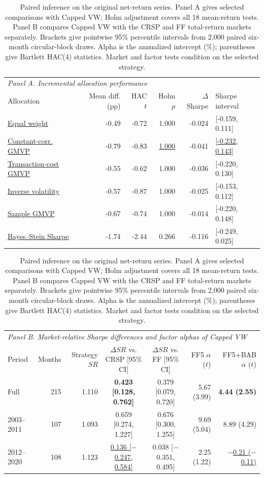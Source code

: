 \documentclass[letterpaper,journal]{IEEEtran}
\begin{document}
\begin{table}[!tp]\centering
\caption{Paired inference on the original net-return series. Panel A gives selected comparisons with Capped VW; Holm adjustment covers all 18 mean-return tests. Panel B compares Capped VW with the CRSP and FF total-return markets separately. Brackets give pointwise 95\% percentile intervals from 2,000 paired six-month circular-block draws. Alpha is the annualized intercept (\%); parentheses give Bartlett HAC(4) statistics. Market and factor tests condition on the selected strategy.}\label{tab:inference}
\small\begin{tabular}{lrrrrl}\toprule
\multicolumn{6}{l}{\textit{Panel A. Incremental allocation performance}}\\[2pt]
Allocation & Mean diff. (pp) & HAC $t$ & Holm $p$ & $\Delta$Sharpe & Sharpe interval\\\midrule
\hyperref[alloc:equal_weight]{Equal weight} & -0.49 & -0.72 & 1.000 & -0.024 & [-0.159, 0.111] \\
\hyperref[alloc:gmvp_constant_corr]{Constant-corr. GMVP} & -0.79 & -0.83 & \underline{1.000} & -0.041 & \underline{[-0.232, 0.143]} \\
\hyperref[alloc:tc_gmvp]{Transaction-cost GMVP} & -0.55 & -0.62 & 1.000 & -0.036 & [-0.220, 0.130] \\
\hyperref[alloc:inverse_vol]{Inverse volatility} & -0.57 & -0.87 & 1.000 & -0.025 & [-0.153, 0.112] \\
\hyperref[alloc:gmvp_sample]{Sample GMVP} & -0.67 & -0.74 & 1.000 & -0.014 & [-0.220, 0.148] \\
\hyperref[alloc:max_sharpe_bs]{Bayes--Stein Sharpe} & -1.74 & -2.44 & 0.266 & -0.116 & [-0.249, 0.025] \\
\bottomrule\end{tabular}
\par\medskip\begingroup\small\setlength{\tabcolsep}{3.5pt}
\begin{tabular}{lrrccrr}\toprule
\multicolumn{7}{l}{\textit{Panel B. Market-relative Sharpe differences and factor alphas of Capped VW}}\\[2pt]
Period & Months & Strategy $SR$ & $\Delta SR$ vs. CRSP [95\% CI] & $\Delta SR$ vs. FF [95\% CI] & FF5 $\alpha$ ($t$) & FF5+BAB $\alpha$ ($t$)\\\midrule
Full & 215 & 1.110 & \textbf{0.423 [0.128, 0.762]} & 0.379 [0.079, 0.720] & 5.67 (3.99) & \textbf{4.44 (2.55)}\\
2003--2011 & 107 & 1.093 & 0.659 [0.274, 1.227] & 0.676 [0.300, 1.255] & 9.69 (5.04) & 8.89 (4.29)\\
2012--2020 & 108 & 1.123 & \underline{0.136 [$-$0.247, 0.584]} & 0.038 [$-$0.351, 0.495] & 2.25 (1.22) & \underline{$-$0.21 ($-$0.11)}\\
\bottomrule\end{tabular}\endgroup
\end{table}
\end{document}
